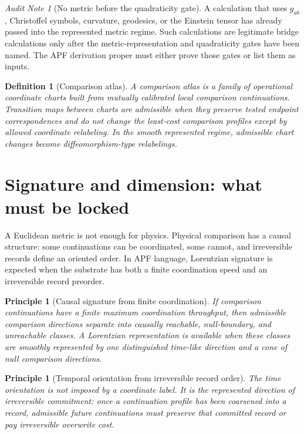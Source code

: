 \documentclass[11pt]{article}
\newtheorem{definition}[theorem]{Definition}
\newtheorem{principle}[theorem]{Principle}
\theoremstyle{remark}
\newtheorem{audit}[theorem]{Audit Note}
\begin{document}
\begin{audit}[No metric before the quadraticity gate]
A calculation that uses \(g_{ab}\), Christoffel symbols, curvature, geodesics, or the Einstein tensor has already passed into the represented metric regime.  Such calculations are legitimate bridge calculations only after the metric-representation and quadraticity gates have been named.  The APF derivation proper must either prove those gates or list them as inputs.
\end{audit}

\begin{definition}[Comparison atlas]
A comparison atlas is a family of operational coordinate charts built from mutually calibrated local comparison continuations.  Transition maps between charts are admissible when they preserve tested endpoint correspondences and do not change the least-cost comparison profiles except by allowed coordinate relabeling.  In the smooth represented regime, admissible chart changes become diffeomorphism-type relabelings.
\end{definition}

\section{Signature and dimension: what must be locked}

A Euclidean metric is not enough for physics.  Physical comparison has a causal structure: some continuations can be coordinated, some cannot, and irreversible records define an oriented order.  In APF language, Lorentzian signature is expected when the substrate has both a finite coordination speed and an irreversible record preorder.

\begin{principle}[Causal signature from finite coordination]
If comparison continuations have a finite maximum coordination throughput, then admissible comparison directions separate into causally reachable, null-boundary, and unreachable classes.  A Lorentzian representation is available when these classes are smoothly represented by one distinguished time-like direction and a cone of null comparison directions.
\end{principle}

\begin{principle}[Temporal orientation from irreversible record order]
The time orientation is not imposed by a coordinate label.  It is the represented direction of irreversible commitment: once a continuation profile has been coarsened into a record, admissible future continuations must preserve that committed record or pay irreversible overwrite cost.
\end{principle}
\end{document}
